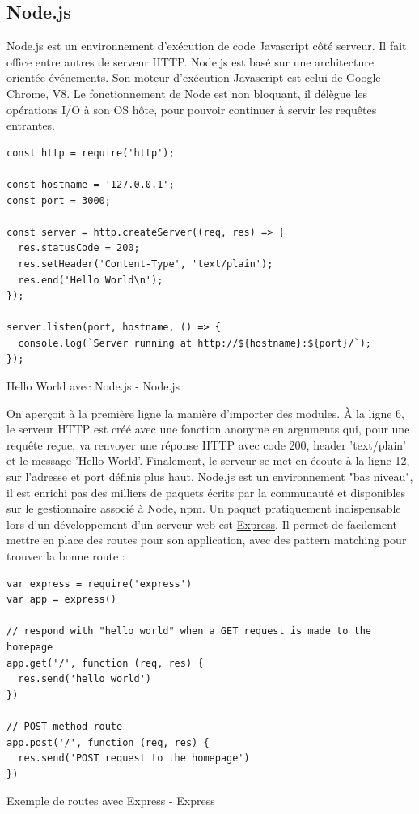\documentclass[a4paper, 12pt]{article}
\newenvironment{code}{\captionsetup{type=listing}}{}
\begin{document}
\subsection{Node.js}
Node.js est un environnement d'exécution de code Javascript côté serveur. Il fait office entre autres de serveur HTTP.
Node.js est basé sur une architecture orientée événements. Son moteur d'exécution Javascript est celui de Google Chrome, V8. 
Le fonctionnement de Node est non bloquant, il délègue les opérations I/O à son OS hôte, pour pouvoir continuer à servir 
les requêtes entrantes.
\begin{code}
    \begin{verbatim}
const http = require('http');

const hostname = '127.0.0.1';
const port = 3000;

const server = http.createServer((req, res) => {
  res.statusCode = 200;
  res.setHeader('Content-Type', 'text/plain');
  res.end('Hello World\n');
});

server.listen(port, hostname, () => {
  console.log(`Server running at http://${hostname}:${port}/`);
});
    \end{verbatim}
    \caption{Hello World avec Node.js - Node.js \cite{ref170}}
\end{code}
On aperçoit à la première ligne la manière d'importer des modules. À la ligne 6, le serveur HTTP est créé avec 
une fonction anonyme en arguments qui, pour une requête reçue, va renvoyer une réponse HTTP avec code 200, header 
'text/plain' et le message 'Hello World'. Finalement, le serveur se met en écoute à la ligne 12, sur l'adresse et 
port définis plus haut. Node.js est un environnement "bas niveau", il est enrichi pas des milliers de paquets écrits 
par la communauté et disponibles sur le gestionnaire associé à Node, \href{https://www.npmjs.com/}{npm}. Un paquet 
pratiquement indispensable lors d'un développement d'un serveur web est \href{http://expressjs.com/}{Express}. Il 
permet de facilement mettre en place des routes pour son application, avec des pattern matching pour trouver la bonne 
route :
\begin{code}
    \begin{verbatim}
var express = require('express')
var app = express()

// respond with "hello world" when a GET request is made to the homepage
app.get('/', function (req, res) {
  res.send('hello world')
})

// POST method route
app.post('/', function (req, res) {
  res.send('POST request to the homepage')
})
    \end{verbatim}
    \caption{Exemple de routes avec Express - Express \cite{ref180}}
\end{code}
\end{document}
